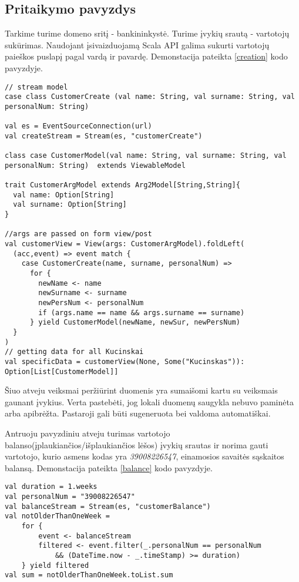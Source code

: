 \subsection{Pritaikymo pavyzdys}

    Tarkime turime domeno sritį - bankininkystė. Turime įvykių srautą - vartotojų sukūrimas. Naudojant įsivaizduojamą Scala API galima sukurti vartotojų paieškos puslapį pagal vardą ir pavardę. Demonstacija pateikta \ref{creation} kodo pavyzdyje.

\begin{lstlisting}[caption=Vartotojų paieškos puslapis naudojant įsivaizduojamą Scala API, label=creation]
// stream model
case class CustomerCreate (val name: String, val surname: String, val personalNum: String)

val es = EventSourceConnection(url)
val createStream = Stream(es, "customerCreate")

class case CustomerModel(val name: String, val surname: String, val personalNum: String)  extends ViewableModel

trait CustomerArgModel extends Arg2Model[String,String]{
  val name: Option[String]
  val surname: Option[String]
}

//args are passed on form view/post
val customerView = View(args: CustomerArgModel).foldLeft(
  (acc,event) => event match {
    case CustomerCreate(name, surname, personalNum) =>
      for {
        newName <- name
        newSurname <- surname
        newPersNum <- personalNum
        if (args.name == name && args.surname == surname)
      } yield CustomerModel(newName, newSur, newPersNum)
  }
)
// getting data for all Kucinskai
val specificData = customerView(None, Some("Kucinskas")): Option[List[CustomerModel]]
\end{lstlisting}

    Šiuo atveju veiksmai peržiūrint duomenis yra sumaišomi kartu su veiksmais gaunant įvykius. Verta pastebėti, jog lokali duomenų saugykla nebuvo paminėta arba apibrėžta. Pastaroji gali būti sugeneruota bei valdoma automatiškai.

    Antruoju pavyzdiniu atveju turimas vartotojo balanso(įplaukiančios/išplaukiančios lėšos) įvykių srautas ir norima gauti vartotojo, kurio asmens kodas yra \emph{39008226547}, einamosios savaitės sąskaitos balansą. Demonstacija pateikta \ref{balance} kodo pavyzdyje.

\begin{lstlisting}[caption=Vartotojo einamosios sąskaitos balansas naudojant įsivaizduojamą Scala API, label=balance]
val duration = 1.weeks
val personalNum = "39008226547"
val balanceStream = Stream(es, "customerBalance")
val notOlderThanOneWeek =
    for {
        event <- balanceStream
        filtered <- event.filter(_.personalNum == personalNum
            && (DateTime.now - _.timeStamp) >= duration)
    } yield filtered
val sum = notOlderThanOneWeek.toList.sum
\end{lstlisting}

